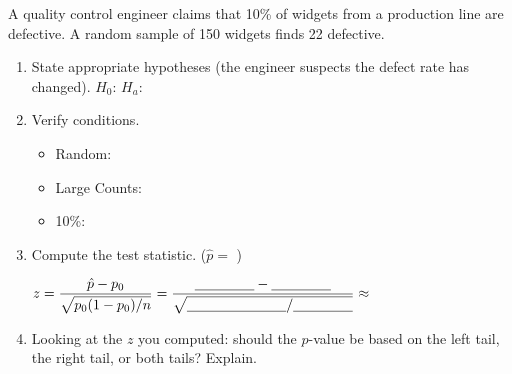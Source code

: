 \documentclass[10pt]{article}
\begin{document}
\namedateperiod

\vspace{0.15in}

A quality control engineer claims that 10\% of widgets from a production line are defective.
A random sample of 150 widgets finds 22 defective.

\begin{enumerate}
  \item State appropriate hypotheses (the engineer suspects the defect rate has changed).
        $H_0$: \blank{4cm} \quad $H_a$: \blank{4cm}

  \item Verify conditions.
        \begin{itemize}
          \item Random: \blank{5cm}
          \item Large Counts: \blank{7cm}
          \item 10\%: \blank{5cm}
        \end{itemize}

  \item Compute the test statistic.  ($\hat p = $ \blank{2cm})

        $z = \dfrac{\hat p - p_0}{\sqrt{p_0(1-p_0)/n}} = \dfrac{\blank{1.5cm} - \blank{1.5cm}}{\sqrt{\blank{2.5cm}/\blank{1.5cm}}} \approx$ \blank{2cm}

  \item Looking at the $z$ you computed: should the $p$-value be based on the left tail,
        the right tail, or both tails? Explain.
\end{enumerate}
\end{document}
